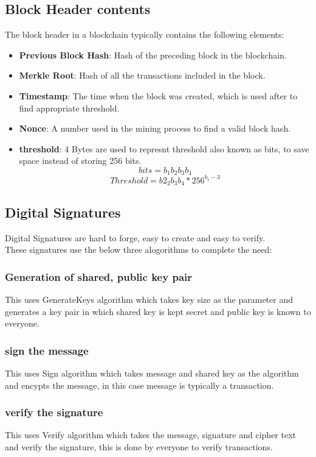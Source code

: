 \documentclass{article}
\begin{document}
\subsection{Block Header contents}
The block header in a blockchain typically contains the following elements:
\begin{itemize}
    \item \textbf{Previous Block Hash}: Hash of the preceding block in the blockchain.
    \item \textbf{Merkle Root}: Hash of all the transactions included in the block.
    \item \textbf{Timestamp}: The time when the block was created, which is used after to find appropriate threshold.
    \item \textbf{Nonce}: A number used in the mining process to find a valid block hash.
    \item \textbf{threshold}: 4 Bytes are used to represnt threshold also known as bits, to save space instead of storing 256 bits.
    $$bits = b_1b_2b_3b_4$$
    $$Threshold = b2_2b_3b_4 * 256^{b_1 - 3}$$
\end{itemize}
\subsection{Digital Signatures}
Digital Signatures are hard to forge, easy to create and easy to verify. \\
These signatures use the below three alogorithms to complete the need:
\subsubsection{Generation of shared, public key pair}
This uses GenerateKeys algorithm which takes key size as the parameter and generates a key pair in which shared key is kept secret and public key is known to everyone.
\subsubsection{sign the message}
This uses Sign algorithm which takes message and shared key as the algorithm and encypts the message, in this case message is typically a transaction. 
\subsubsection{verify the signature}
This uses Verify algorithm which takes the message, signature and cipher text and verify the signature, this is done by everyone to verify transactions.
\end{document}
